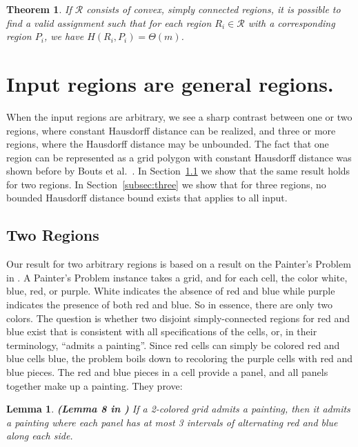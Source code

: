 \documentclass[a4paper, 11pt]{article}
\newtheorem{lemma}{Lemma}
\newtheorem{theorem}{Theorem}
\newcommand{\etal}{\textnormal{et al.}\xspace}
\begin{document}
\begin{theorem}
	If \(\mathcal{R}\) consists of convex, simply connected regions, it is possible to find a valid assignment such that for each region \(R_i \in \mathcal{R}\) with a corresponding region \(P_i\), we have \(H(R_i, P_i) = \Theta(m)\).
\end{theorem}

\section{Input regions are general regions.}
\label{sec:general}

When the input regions are arbitrary, we see a sharp contrast between one or two regions, where constant Hausdorff distance can be realized, and three or more regions, where the Hausdorff distance may be unbounded.
The fact that one region can be represented as a grid polygon with constant Hausdorff distance was shown before by Bouts \etal~\cite{bouts2016mapping}. In Section~\ref{subsec:two} we show that the same result holds for two regions. In Section~\ref{subsec:three}
we show that for three regions, no bounded Hausdorff distance bound exists that applies to all input.

\subsection{Two Regions}
\label{subsec:two}

Our result for two arbitrary regions is based on
a result on the Painter's Problem in \cite{goethem2017painter}.
A Painter's Problem instance takes a grid, and for each cell, the color white, blue, red, or purple. White indicates the absence of red and blue while purple indicates the presence of both red and blue. So in
essence, there are only two colors.
The question is whether two disjoint simply-connected regions for red and blue exist that is consistent with all specifications of the
cells, or, in their terminology, ``admits a painting''. Since red cells can simply be colored red and blue cells blue, the problem boils down to recoloring the purple cells with red and blue pieces. The red and blue pieces in a cell provide a panel, and all panels together make up a painting. They prove:

\begin{lemma} {\bf (Lemma 8 in \cite{goethem2017painter})}
\label{lem:painting}
If a 2-colored grid admits a painting, then it admits a painting where each panel has at most 3 intervals of alternating red and blue along each side.
\end{lemma}
\end{document}
